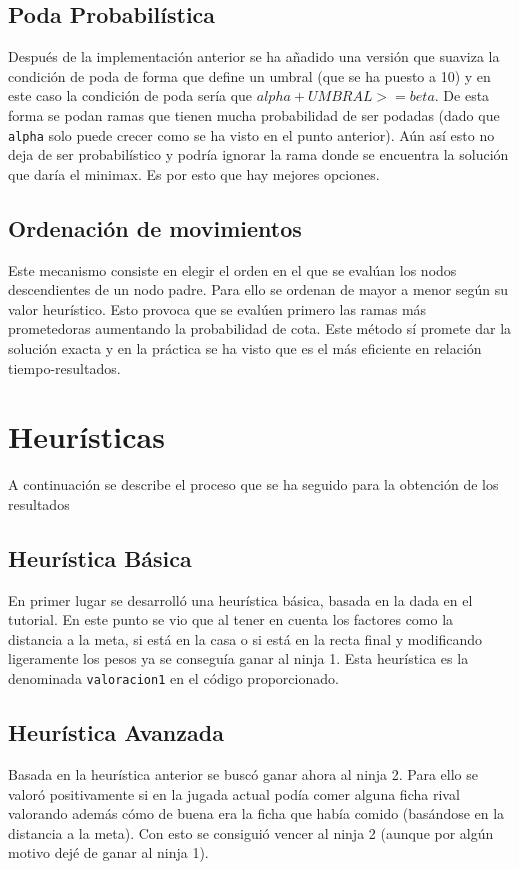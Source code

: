 \documentclass[12pt]{article}
\begin{document}
    \subsection{Poda Probabilística}
    Después de la implementación anterior se ha añadido una versión que suaviza la condición de poda de forma que define un umbral (que se ha puesto a 10) y en este caso la condición de poda sería que $alpha + UMBRAL>=beta$. De esta forma se podan ramas que tienen mucha probabilidad de ser podadas (dado que \verb|alpha| solo puede crecer como se ha visto en el punto anterior). Aún así esto no deja de ser probabilístico y podría ignorar la rama donde se encuentra la solución que daría el minimax. Es por esto que hay mejores opciones.

    \subsection{Ordenación de movimientos}
    Este mecanismo consiste en elegir el orden en el que se evalúan los nodos descendientes de un nodo padre. Para ello se ordenan de mayor a menor según su valor heurístico. Esto provoca que se evalúen primero las ramas más prometedoras aumentando la probabilidad de cota. Este método sí promete dar la solución exacta y en la práctica se ha visto que es el más eficiente en relación tiempo-resultados.

    \section{Heurísticas}
    A continuación se describe el proceso que se ha seguido para la obtención de los resultados

    \subsection{Heurística Básica}
    En primer lugar se desarrolló una heurística básica, basada en la dada en el tutorial. En este punto se vio que al tener en cuenta los factores como la distancia a la meta, si está en la casa o si está en la recta final y modificando ligeramente los pesos ya se conseguía ganar al ninja 1. Esta heurística es la denominada \verb|valoracion1| en el código proporcionado.

    \subsection{Heurística Avanzada}
    Basada en la heurística anterior se buscó ganar ahora al ninja 2. Para ello se valoró positivamente si en la jugada actual podía comer alguna ficha rival valorando además cómo de buena era la ficha que había comido (basándose en la distancia a la meta). Con esto se consiguió vencer al ninja 2 (aunque por algún motivo dejé de ganar al ninja 1).
\end{document}
